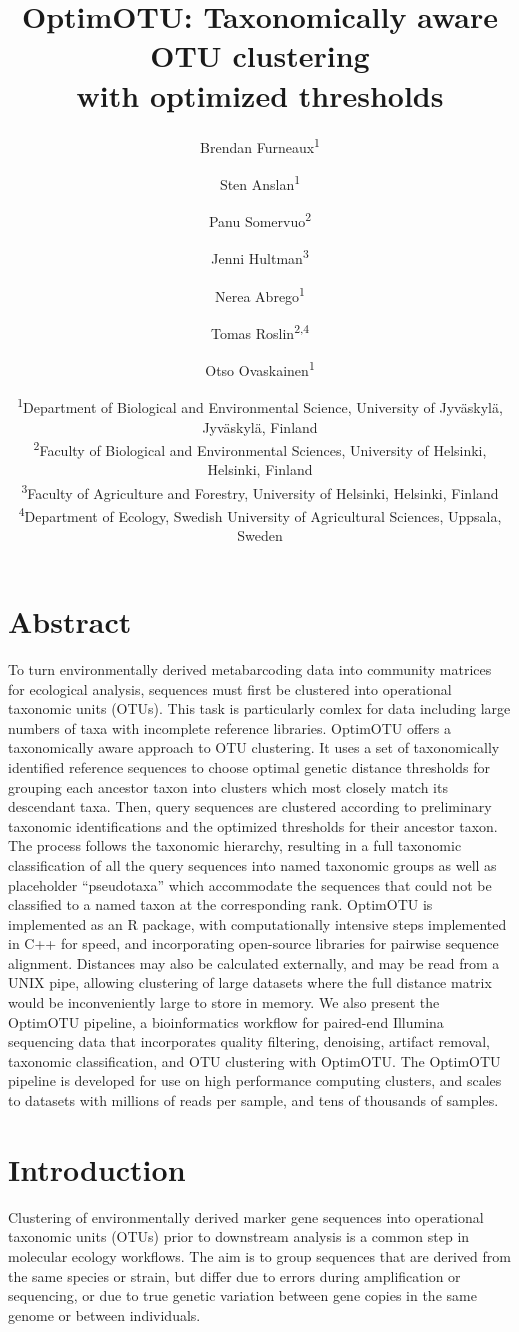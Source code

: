\documentclass[
]{article}
\title{OptimOTU: Taxonomically aware OTU clustering\\
with optimized thresholds}
\author{Brendan Furneaux\textsuperscript{1} \and Sten Anslan\textsuperscript{1} \and Panu Somervuo\textsuperscript{2} \and Jenni Hultman\textsuperscript{3} \and Nerea Abrego\textsuperscript{1} \and Tomas Roslin\textsuperscript{2,4} \and Otso Ovaskainen\textsuperscript{1}}
\date{\textsuperscript{1}Department of Biological and Environmental Science, University of Jyväskylä, Jyväskylä, Finland\\
\textsuperscript{2}Faculty of Biological and Environmental Sciences, University of Helsinki, Helsinki, Finland\\
\textsuperscript{3}Faculty of Agriculture and Forestry, University of Helsinki, Helsinki, Finland\\
\textsuperscript{4}Department of Ecology, Swedish University of Agricultural Sciences, Uppsala, Sweden}
\begin{document}
\maketitle

\section{Abstract}\label{abstract}

To turn environmentally derived metabarcoding data into community matrices for ecological analysis, sequences must first be clustered into operational taxonomic units (OTUs).
This task is particularly comlex for data including large numbers of taxa with incomplete reference libraries.
OptimOTU offers a taxonomically aware approach to OTU clustering.
It uses a set of taxonomically identified reference sequences to choose optimal genetic distance thresholds for grouping each ancestor taxon into clusters which most closely match its descendant taxa.
Then, query sequences are clustered according to preliminary taxonomic identifications and the optimized thresholds for their ancestor taxon.
The process follows the taxonomic hierarchy, resulting in a full taxonomic classification of all the query sequences into named taxonomic groups as well as placeholder ``pseudotaxa'' which accommodate the sequences that could not be classified to a named taxon at the corresponding rank.
OptimOTU is implemented as an R package, with computationally intensive steps implemented in C++ for speed, and incorporating open-source libraries for pairwise sequence alignment.
Distances may also be calculated externally, and may be read from a UNIX pipe, allowing clustering of large datasets where the full distance matrix would be inconveniently large to store in memory.
We also present the OptimOTU pipeline, a bioinformatics workflow for paired-end Illumina sequencing data that incorporates quality filtering, denoising, artifact removal, taxonomic classification, and OTU clustering with OptimOTU.
The OptimOTU pipeline is developed for use on high performance computing clusters, and scales to datasets with millions of reads per sample, and tens of thousands of samples.

\section{Introduction}\label{introduction}

Clustering of environmentally derived marker gene sequences into operational taxonomic units (OTUs) prior to downstream analysis is a common step in molecular ecology workflows.
The aim is to group sequences that are derived from the same species or strain, but differ due to errors during amplification or sequencing, or due to true genetic variation between gene copies in the same genome or between individuals.
\end{document}
